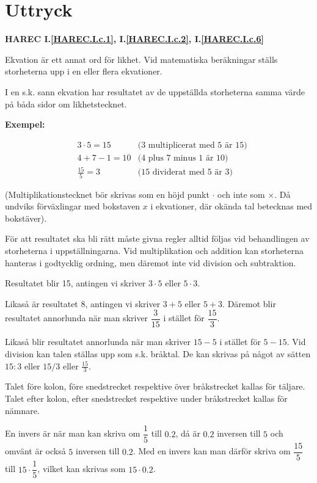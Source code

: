 \section{Uttryck}
\textbf{HAREC
  I.\ref{HAREC.I.c.1}\label{myHAREC.I.c.1},
  I.\ref{HAREC.I.c.2}\label{myHAREC.I.c.2},
  I.\ref{HAREC.I.c.6}\label{myHAREC.I.c.6}
}

Ekvation är ett annat ord för likhet.
Vid matematiska beräkningar ställs storheterna upp i en eller flera ekvationer.

I en s.k. sann ekvation har resultatet av de uppställda storheterna samma värde
på båda sidor om likhetstecknet.

\textbf{Exempel:}

\begin{align*}
 & 3 \cdot 5 = 15   & \text{(3 multiplicerat med 5 är 15)} \\
 & 4 + 7 - 1 = 10   & \text{(4 plus 7 minus 1 är 10)}      \\
 & \frac{15}{5} = 3 & \text{(15 dividerat med 5 är 3)}
\end{align*}

(Multiplikationstecknet bör skrivas som en höjd punkt \(\cdot\) och inte som
\(\times\).
Då undviks förväxlingar med bokstaven \(x\) i ekvationer, där okända tal
betecknas med bokstäver).

För att resultatet ska bli rätt måste givna regler alltid följas vid
behandlingen av storheterna i uppställningarna.
Vid multiplikation och addition kan storheterna hanteras i godtycklig ordning,
men däremot inte vid division och subtraktion.

Resultatet blir 15, antingen vi skriver \(3 \cdot 5\) eller \(5 \cdot 3\).

Likaså är resultatet 8, antingen vi skriver \(3 + 5\) eller \(5 + 3\).
Däremot blir resultatet annorlunda när man skriver \(\dfrac{3}{15}\) i stället
för \(\dfrac{15}{3}\).

Likaså blir resultatet annorlunda när man skriver \(15 - 5\) i stället för
\(5 - 15\).
Vid division kan talen ställas upp som s.k. bråktal.
De kan skrivas på något av sätten \(15:3\) eller \(15/3\) eller
\(\frac{15}{3}\).

Talet före kolon, före snedstrecket respektive över bråkstrecket kallas för
täljare.
Talet efter kolon, efter snedstrecket respektive under bråkstrecket kallas för
nämnare.

En invers är när man kan skriva om \(\dfrac{1}{5}\) till \(0.2\), då är
\(0.2\) inversen till \(5\) och omvänt är också \(5\) inversen till \(0.2\).
Med en invers kan man därför skriva om \(\dfrac{15}{5}\) till
\(15 \cdot \dfrac{1}{5}\), vilket kan skrivas som  \(15 \cdot 0.2\).

